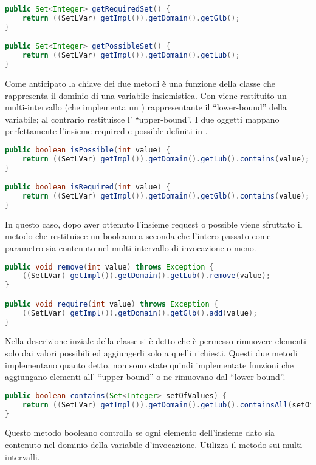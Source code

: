 \begin{lstlisting}[language = Java,
                   caption = {metodi ``getter'' per il dominio.}]
public Set<Integer> getRequiredSet() {
	return ((SetLVar) getImpl()).getDomain().getGlb();
}

public Set<Integer> getPossibleSet() {
	return ((SetLVar) getImpl()).getDomain().getLub();
}
\end{lstlisting}
Come anticipato la chiave dei due metodi è una funzione della classe
 che rappresenta il dominio di una variabile insiemistica.
Con  viene restituito un multi-intervallo (che implementa un
) rappresentante il ``lower-bound'' della variabile; al
contrario  restituisce l' ``upper-bound''. I due oggetti
mappano perfettamente l'insieme required e possible definiti in .

\begin{lstlisting}[language = Java,
                   caption = {un intero è possibile o richiesto?.}]
public boolean isPossible(int value) {
	return ((SetLVar) getImpl()).getDomain().getLub().contains(value);
}

public boolean isRequired(int value) {
	return ((SetLVar) getImpl()).getDomain().getGlb().contains(value);
}
\end{lstlisting}
In questo caso, dopo aver ottenuto l'insieme request o possible viene
sfruttato il metodo  che restituisce un booleano a seconda che
l'intero passato come parametro sia contenuto nel multi-intervallo di 
invocazione o meno.

\begin{lstlisting}[language = Java,
                   caption = {inserire e rimuovere elementi.}]
public void remove(int value) throws Exception {
	((SetLVar) getImpl()).getDomain().getLub().remove(value);	
}

public void require(int value) throws Exception {
	((SetLVar) getImpl()).getDomain().getGlb().add(value);	
}
\end{lstlisting}
Nella descrizione inziale della classe si è detto che è 
permesso rimuovere elementi solo dai valori possibili ed aggiungerli solo a
quelli richiesti. Questi due metodi implementano quanto detto, non sono
state quindi implementate funzioni che aggiungano elementi all' ``upper-bound''
o ne rimuovano dal ``lower-bound''.

\begin{lstlisting}[language = Java,
                   caption = {\files{this} $\stackrel{?}{\supseteq}$ \files{setOfValues}.}]
public boolean contains(Set<Integer> setOfValues) {
	return ((SetLVar) getImpl()).getDomain().getLub().containsAll(setOfValues);
}
\end{lstlisting}
Questo metodo booleano controlla se ogni elemento dell'insieme dato sia 
contenuto nel dominio della variabile d'invocazione. Utilizza il metodo 
 sui multi-intervalli.

